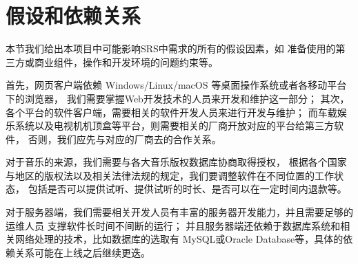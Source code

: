 \section{假设和依赖关系}

本节我们给出本项目中可能影响SRS中需求的所有的假设因素，如
    准备使用的第三方或商业组件，操作和开发环境的问题约束等。

首先，网页客户端依赖 Windows/Linux/macOS 等桌面操作系统或者各移动平台下的浏览器，
    我们需要掌握Web开发技术的人员来开发和维护这一部分；
其次，各个平台的软件客户端，需要相关的软件开发人员来进行开发与维护；
而车载娱乐系统以及电视机机顶盒等平台，则需要相关的厂商开放对应的平台给第三方软件，
    否则，我们应先与对应的厂商去的合作关系。

对于音乐的来源，我们需要与各大音乐版权数据库协商取得授权，
    根据各个国家与地区的版权法以及相关法律法规的规定，我们要调整软件在不同位置的工作状态，
    包括是否可以提供试听、提供试听的时长、是否可以在一定时间内退款等。

对于服务器端，我们需要相关开发人员有丰富的服务器开发能力，并且需要足够的运维人员
    支撑软件长时间不间断的运行；
并且服务器端还依赖于数据库系统和相关网络处理的技术，比如数据库的选取有
    MySQL或Oracle Database等，具体的依赖关系可能在上线之后继续更迭。